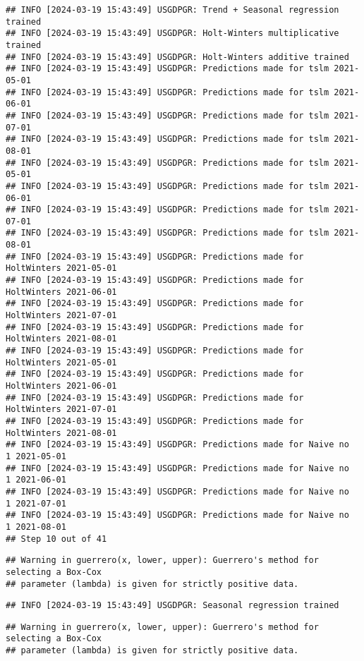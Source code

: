 \documentclass[
]{article}
\begin{document}
\begin{verbatim}
## INFO [2024-03-19 15:43:49] USGDPGR: Trend + Seasonal regression trained
## INFO [2024-03-19 15:43:49] USGDPGR: Holt-Winters multiplicative trained
## INFO [2024-03-19 15:43:49] USGDPGR: Holt-Winters additive trained
## INFO [2024-03-19 15:43:49] USGDPGR: Predictions made for tslm 2021-05-01
## INFO [2024-03-19 15:43:49] USGDPGR: Predictions made for tslm 2021-06-01
## INFO [2024-03-19 15:43:49] USGDPGR: Predictions made for tslm 2021-07-01
## INFO [2024-03-19 15:43:49] USGDPGR: Predictions made for tslm 2021-08-01
## INFO [2024-03-19 15:43:49] USGDPGR: Predictions made for tslm 2021-05-01
## INFO [2024-03-19 15:43:49] USGDPGR: Predictions made for tslm 2021-06-01
## INFO [2024-03-19 15:43:49] USGDPGR: Predictions made for tslm 2021-07-01
## INFO [2024-03-19 15:43:49] USGDPGR: Predictions made for tslm 2021-08-01
## INFO [2024-03-19 15:43:49] USGDPGR: Predictions made for HoltWinters 2021-05-01
## INFO [2024-03-19 15:43:49] USGDPGR: Predictions made for HoltWinters 2021-06-01
## INFO [2024-03-19 15:43:49] USGDPGR: Predictions made for HoltWinters 2021-07-01
## INFO [2024-03-19 15:43:49] USGDPGR: Predictions made for HoltWinters 2021-08-01
## INFO [2024-03-19 15:43:49] USGDPGR: Predictions made for HoltWinters 2021-05-01
## INFO [2024-03-19 15:43:49] USGDPGR: Predictions made for HoltWinters 2021-06-01
## INFO [2024-03-19 15:43:49] USGDPGR: Predictions made for HoltWinters 2021-07-01
## INFO [2024-03-19 15:43:49] USGDPGR: Predictions made for HoltWinters 2021-08-01
## INFO [2024-03-19 15:43:49] USGDPGR: Predictions made for Naive no  1 2021-05-01
## INFO [2024-03-19 15:43:49] USGDPGR: Predictions made for Naive no  1 2021-06-01
## INFO [2024-03-19 15:43:49] USGDPGR: Predictions made for Naive no  1 2021-07-01
## INFO [2024-03-19 15:43:49] USGDPGR: Predictions made for Naive no  1 2021-08-01
## Step 10 out of 41
\end{verbatim}

\begin{verbatim}
## Warning in guerrero(x, lower, upper): Guerrero's method for selecting a Box-Cox
## parameter (lambda) is given for strictly positive data.
\end{verbatim}

\begin{verbatim}
## INFO [2024-03-19 15:43:49] USGDPGR: Seasonal regression trained
\end{verbatim}

\begin{verbatim}
## Warning in guerrero(x, lower, upper): Guerrero's method for selecting a Box-Cox
## parameter (lambda) is given for strictly positive data.
\end{verbatim}
\end{document}
